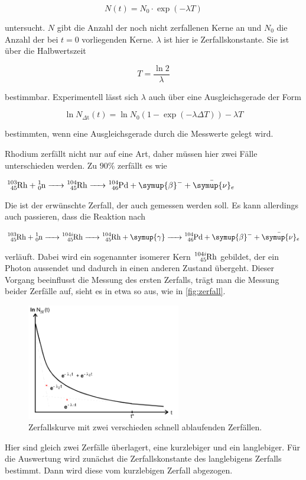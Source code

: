 \begin{equation}
    N \left(t\right) = N_0 \cdot \exp(-\lambda T)
    \label{eq:zerfall}
\end{equation}

untersucht.
$N$ gibt die Anzahl der noch nicht zerfallenen Kerne an und $N_0$ die Anzahl der bei $t = 0$ vorliegenden Kerne.
$\lambda$ ist hier ie Zerfallskonstante.
Sie ist über die Halbwertszeit 

\begin{equation}
    T = \frac{\ln{2}}{\lambda}
    \label{eq:lambda}
\end{equation}

bestimmbar.
Experimentell lässt sich $\lambda$ auch über eine Ausgleichsgerade der Form

\begin{equation}
    \ln{N_{\Delta \text{t}}\left(t\right)} = \ln{ N_0 \left(1 - \exp(-\lambda \Delta T) \right)} -\lambda T
    \label{eq:lambda2}
\end{equation}

bestimmten, wenn eine Ausgleichsgerade durch die Messwerte gelegt wird.

Rhodium zerfällt nicht nur auf eine Art, daher müssen hier zwei Fälle unterschieden werden.
Zu $90\%$ zerfällt es wie

$\ce{^{103}_{45}Rh + ^{1}_0n -> ^{104}_{45}Rh -> ^{104}_{46}Pd + \symup{\beta}- + \bar{\symup{\nu}}_e}$

Die ist der erwünschte Zerfall, der auch gemessen werden soll.
Es kann allerdings auch passieren, dass die Reaktion nach

$\ce{^{103}_{45}Rh + ^{1}_0n -> ^{104i}_{45}Rh -> ^{104}_{45}Rh + \symup{\gamma} -> ^{104}_{46}Pd + \symup{\beta}- + \bar{\symup{\nu}}_e}$

verläuft.
Dabei wird ein sogenannter isomerer Kern $\ce{^{104i}_{45}Rh}$ gebildet, der ein Photon aussendet und dadurch in einen anderen Zustand übergeht. 
Dieser Vorgang beeinflusst die Messung des ersten Zerfalls, trägt man die Messung beider Zerfälle auf, sieht es in etwa so aus, wie in \autoref{fig:zerfall}.

\begin{figure}
    \centering
    \includegraphics[width=0.6\textwidth]{images/bild2.png}
    \caption{Zerfallskurve mit zwei verschieden schnell ablaufenden Zerfällen.}
    \label{fig:zerfall}
\end{figure}

Hier sind gleich zwei Zerfälle überlagert, eine kurzlebiger und ein langlebiger.
Für die Auswertung wird zunächst die Zerfallskonstante des langlebigens Zerfalls bestimmt.
Dann wird diese vom kurzlebigen Zerfall abgezogen.
